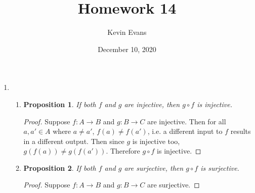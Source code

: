 \documentclass{homework}
\title{Homework 14}
\author{Kevin Evans}
\date{December 10, 2020}
\newtheorem*{prop}{Proposition}
\begin{document}
	\maketitle
	\begin{enumerate}
		\item \begin{enumerate}
			\item  \begin{minipage}[t]{\linewidth}
				\begin{prop}
					If both $f$ and $g$ are injective, then $g\circ f$ is injective.
				\end{prop}
				\begin{proof} 
					Suppose $f: A \to B$ and $g : B \to C$ are injective. Then for all $a, a' \in A$ where $a \ne a'$, $f(a) \ne f(a')$, i.e. a different input to $f$ results in a different output. Then since $g$ is injective too, $g(f(a)) \ne g(f(a'))$. Therefore $g \circ f$ is injective.
				\end{proof}
			\end{minipage}
		
			\item  \begin{minipage}[t]{\linewidth}
				\begin{prop}
					If both $f$ and $g$ are surjective, then $g\circ f$ is surjective.
				\end{prop}
				\begin{proof} 
					Suppose $f: A \to B$ and $g : B \to C$ are surjective.
				\end{proof}
			\end{minipage}
			
		\end{enumerate}
	\end{enumerate}
\end{document}
